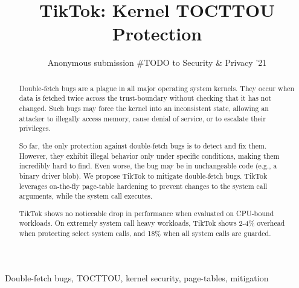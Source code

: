 \documentclass[conference]{IEEEtran}
\newcommand{\sysname}{TikTok}
\newcommand{\roughevaloverheadbad}{18\%}
\newcommand{\roughevaloverheadbetter}{2-4\%}
\begin{document}

\date{}

\title{\Large \bf TikTok: Kernel TOCTTOU Protection}

\author{
Anonymous submission \#TODO to Security & Privacy '21
} %

\maketitle

\begin{abstract}

Double-fetch bugs are a plague in all major operating system kernels.  They
occur when data is fetched twice across the trust-boundary without checking that
it has not changed. Such bugs may force the kernel into an inconsistent state,
allowing an attacker to illegally access memory, cause denial of service, or to
escalate their privileges.

So far, the only protection against double-fetch bugs is to detect and fix them.
However, they exhibit illegal behavior only under specific conditions, making
them incredibly hard to find. Even worse, the bug may be in unchangeable code
(e.g., a binary driver blob).
%
We propose \sysname{} to mitigate double-fetch bugs.  \sysname{} leverages
on-the-fly page-table hardening to prevent changes to the system call arguments,
while the system call executes.

\sysname{} shows no noticeable drop in performance when evaluated on CPU-bound
workloads. On extremely system call heavy workloads, \sysname{} shows
\roughevaloverheadbetter{} overhead when protecting select system calls, and
\roughevaloverheadbad{} when all system calls are guarded.


\end{abstract}

\begin{IEEEkeywords}
Double-fetch bugs, TOCTTOU, kernel security, page-tables, mitigation
\end{IEEEkeywords}
\end{document}
